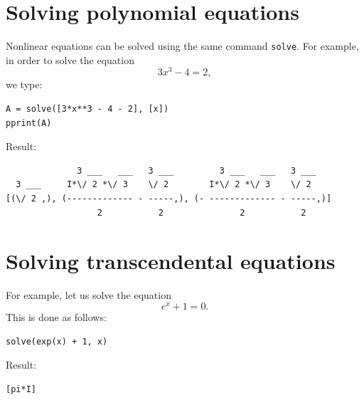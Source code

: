 \documentclass{article}
\begin{document}
\section{Solving polynomial equations}

Nonlinear equations can be solved using the same command {\tt solve}.
For example, in order to solve the equation 
$$
3x^3 - 4 = 2,
$$
we type:
\begin{verbatim}
A = solve([3*x**3 - 4 - 2], [x])
pprint(A)
\end{verbatim}
Result:
\begin{verbatim}
              3 ___   ___   3 ___         3 ___   ___   3 ___   
  3 ___     I*\/ 2 *\/ 3    \/ 2        I*\/ 2 *\/ 3    \/ 2    
[(\/ 2 ,), (------------- - -----,), (- ------------- - -----,)]
                  2           2               2           2     
\end{verbatim}

\section{Solving transcendental equations}

For example, let us solve the equation
$$
e^x + 1 = 0.
$$
This is done as follows:
\begin{verbatim}
solve(exp(x) + 1, x)
\end{verbatim}
Result:
\begin{verbatim}
[pi*I]
\end{verbatim}

\end{document}
